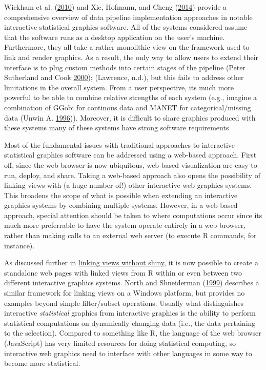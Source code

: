 \documentclass[12pt,]{isuthesis}
\begin{document}
Wickham et al. (\protect\hyperlink{ref-plumbing}{2010}) and Xie,
Hofmann, and Cheng (\protect\hyperlink{ref-Xie:2014co}{2014}) provide a
comprehensive overview of data pipeline implementation approaches in
notable interactive statistical graphics software. All of the systems
considered assume that the software runs as a desktop application on the
user's machine. Furthermore, they all take a rather monolithic view on
the framework used to link and render graphics. As a result, the only
way to allow users to extend their interface is to plug custom methods
into certain stages of the pipeline (Peter Sutherland and Cook
\protect\hyperlink{ref-orca}{2000}); (Lawrence, n.d.), but this fails to
address other limitations in the overall system. From a user
perspective, its much more powerful to be able to combine relative
strengths of each system (e.g., imagine a combination of GGobi for
continous data and MANET for categorical/missing data (Unwin A.
\protect\hyperlink{ref-MANET}{1996})). Moreover, it is difficult to
share graphics produced with these systems many of these systems have
strong software requirements

Most of the fundamental issues with traditional approaches to
interactive statistical graphics software can be addressed using a
web-based approach. First off, since the web browser is now ubiquitous,
web-based visualization are easy to run, deploy, and share. Taking a
web-based approach also opens the possibility of linking views with (a
huge number of!) other interactive web graphics systems. This broadens
the scope of what is possible when extending an interactive graphics
systems by combining multiple systems. However, in a web-based approach,
special attention should be taken to where computations occur since its
much more preferrable to have the system operate entirely in a web
browser, rather than making calls to an external web server (to execute
R commands, for instance).

As discussed further in
\protect\hyperlink{linking-views-without-shiny}{linking views without
shiny}, it is now possible to create a standalone web pages with linked
views from R within or even between two different interactive graphics
systems. North and Shneiderman
(\protect\hyperlink{ref-North:1999vi}{1999}) describes a similar
framework for linking views on a Windows platform, but provides no
examples beyond simple filter/subset operations. Usually what
distinguishes interactive \emph{statistical} graphics from interactive
graphics is the ability to perform statistical computations on
dynamically changing data (i.e., the data pertaining to the selection).
Compared to something like R, the language of the web browser
(JavaScript) has very limited resources for doing statistical computing,
so interactive web graphics need to interface with other languages in
some way to become more statistical.
\end{document}
